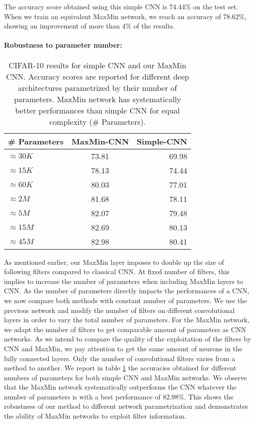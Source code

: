 \documentclass{article}
\begin{document}
The accuracy score obtained using this simple CNN is 74.44\% on the test set.
When we train an equivalent MaxMin network, we reach an accuracy of 78.62\%, showing an improvement of more than 4\% of the results. 
\paragraph*{Robustness to parameter number:}
\begin{table}
\begin{center}
\begin{tabular}{|l|c|r|}
   \hline
   \# Parameters & MaxMin-CNN & Simple-CNN \\
   \hline
	  $ \approx 30K$ & 73.81 & 69.98 \\
   \hline
      $ \approx 15K$ & 78.13 & 74.44 \\
   \hline
      $ \approx 60K$ & 80.03 & 77.01 \\
   \hline
      $ \approx 2M$  & 81.68 & 78.11 \\
   \hline
      $ \approx 5M$  & 82.07 & 79.48 \\
   \hline   
      $ \approx 15M$ & 82.69 & 80.13 \\
   \hline 
      $ \approx 45M$ & 82.98 & 80.41 \\
   \hline 
\end{tabular}
\caption{CIFAR-10 results for simple CNN and our MaxMin CNN. Accuracy scores are reported for different deep architectures parametrized by their number of parameters. MaxMin network has systematically better performances than simple CNN for equal complexity (\# Parameters).}
\label{resultscifar1}
\end{center}
\end{table}
As mentioned earlier, our MaxMin layer imposes to double up the size of following filters compared to classical CNN. At fixed number of filters, this  implies to increase the number of parameters when including MaxMin layers to CNN. As the number of parameters directly impacts the performances of a CNN, we now compare both methods with constant number of parameters. We  use the previous network and modify the number of filters on different convolutional layers in order to vary the total number of parameters. For the MaxMin network, we adapt the number of filters to get comparable amount of parameters as CNN networks. As we intend to compare the quality of the exploitation of the filters by CNN and MaxMin, we pay attention to get the same amount of neurons in the fully connected layers. Only the number of convolutional filters varies from a method to another.
We report in table \ref{resultscifar1} the accuracies obtained for different numbers of parameters for both simple CNN and MaxMin networks.
We observe that the MaxMin network systematically outperforms the CNN whatever the number of parameters is with a best performance of 82.98\%. This shows the robustness of our method to different network parametrization and demonstrates the ability of MaxMin networks to exploit filter information.
\end{document}
